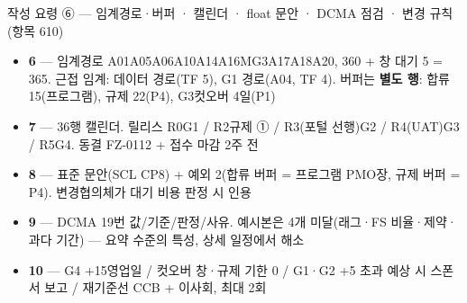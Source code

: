 \begin{frame}{작성 요령 ⑥ — 임계경로·버퍼 · 캘린더 · float 문안 · DCMA 점검 · 변경 규칙 (항목 6\til{}10)}
\begin{itemize}
\item \textbf{6} — 임계경로 A01\ra{}A05\ra{}A06\ra{}A10\ra{}A14\ra{}A16\ra{}MG3\ra{}A17\ra{}A18\ra{}A20, 360 + 창 대기 5 = 365. 근접 임계: 데이터 경로(TF 5), G1 경로(A04, TF 4). 버퍼는 \textbf{별도 행}: 합류 15(프로그램), 규제 22(P4), G3\ra{}컷오버 4일(P1)
\item \textbf{7} — 36행 캘린더. 릴리스 R0\ra{}G1 / R2\ra{}규제 ① / R3(포털 선행)\ra{}G2 / R4(UAT)\ra{}G3 / R5\ra{}G4. 동결 FZ-01\til{}12 + 접수 마감 2주 전
\item \textbf{8} — 표준 문안(SCL CP8) + 예외 2(합류 버퍼 = 프로그램 PMO장, 규제 버퍼 = P4). 변경협의체가 대기 비용 판정 시 인용
\item \textbf{9} — DCMA 1\til{}9번 값/기준/판정/사유. 예시본은 4개 미달(래그·FS 비율·제약·과다 기간) — 요약 수준의 특성, 상세 일정에서 해소
\item \textbf{10} — G4 +15영업일 / 컷오버 창·규제 기한 0 / G1·G2 +5 초과 예상 시 스폰서 보고 / 재기준선 CCB + 이사회, 최대 2회
\end{itemize}
\end{frame}

